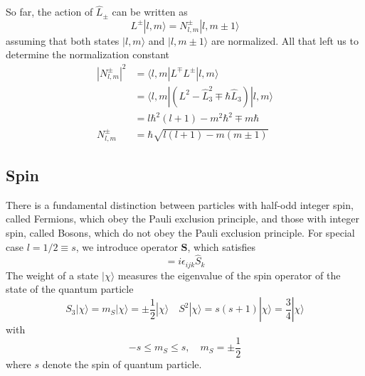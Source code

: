\documentclass[../../../main.tex]{subfiles}
\begin{document}
So far, the action of $\hat{L}_\pm$ can be written as
\begin{equation*}
    L^{\pm} |l,m\rangle = N^{\pm}_{l,m} |l,m \pm 1\rangle
\end{equation*}
assuming that both states $|l,m\rangle$ and $|l,m \pm 1\rangle$ are normalized.
All that left us to determine the normalization constant
\begin{align*}
    |N^{\pm}_{l,m}|^2
     & = \langle l,m|L^{\mp}L^{\pm}|l,m\rangle                              \\
     & =  \langle l,m| (L^2 - \hat{L}_3^2 \mp \hbar  \hat{L}_3) |l,m\rangle \\
     & =  l \hbar^2 (l + 1) - m^2 \hbar ^2 \mp m \hbar                      \\
    N^{\pm}_{l,m}
     & = \hbar \sqrt{l(l + 1) - m(m \pm 1)}
\end{align*}

\subsection{Spin}
There is a fundamental distinction between particles with half-odd integer spin, called Fermions, which obey the Pauli exclusion principle, and those with integer spin, called Bosons, which do not obey the Pauli exclusion principle.
For special case $l=1/2\equiv s$, we introduce operator $\mathbf{S}$, which satisfies
\begin{equation*}
    [\hat{S}_{i}, \hat{S}_{j}] = i \epsilon_{ijk} \hat{S}_{k}
\end{equation*}
The weight of a state $|\chi\rangle$ measures the eigenvalue of the spin operator of the state of the quantum particle
\begin{equation*}
    S_3 |\chi\rangle = m_S |\chi\rangle = \pm \frac{1}{2} |\chi\rangle \quad
    S^2 |\chi\rangle = s(s + 1) |\chi\rangle = \frac{3}{4} |\chi\rangle
\end{equation*}
with
\begin{equation*}
    -s \leq m_S \leq s, \quad  m_S = \pm \frac{1}{2}
\end{equation*}
where $s$ denote the spin of quantum particle.
\end{document}
